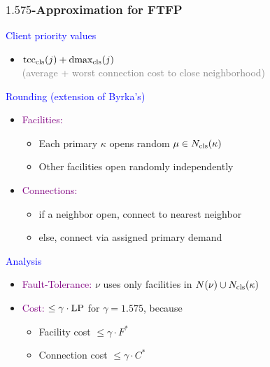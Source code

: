 \documentclass[hyperref,dvipsnames,svgnames,compress]{beamer}
\begin{document}
\begin{frame}
\frametitle{$1.575$-Approximation for FTFP}

{\large

\textcolor{blue}{Client priority values}	
	
	\begin{itemize}
		\item $\mbox{\rm{tcc}}_{{\mbox{\scriptsize\rm cls}}}(j) + \mbox{\rm{dmax}}_{{\mbox{\scriptsize\rm cls}}}(j)$
			\\
			{\normalsize \textcolor{gray}{(average + worst connection cost to close neighborhood)}}
	\end{itemize}

\textcolor{blue}{Rounding (extension of Byrka's)}

  	\begin{itemize}
  	  	\item  \textcolor{purple}{Facilities:} 
			\begin{itemize}
				\item Each primary $\kappa$ opens random $\mu\in N_{{\mbox{\scriptsize\rm cls}}}(\kappa)$
				\item Other facilities open randomly independently
			\end{itemize}
	  	\item \textcolor{purple}{Connections:} 
	 		\begin{itemize}
					\item if a neighbor open, connect to nearest neighbor
					\item else, connect via assigned primary demand
			\end{itemize}
  	\end{itemize}

\textcolor{blue}{Analysis}

  \begin{itemize}
  	\item \textcolor{purple}{Fault-Tolerance:} $\nu$ uses only facilities in
	    $N(\nu) \cup N_{{\mbox{\scriptsize\rm cls}}}(\kappa)$
	
  	\item \textcolor{purple}{Cost:} $\le \gamma\cdot\mbox{\rm LP}$ for $\gamma = 1.575$, because
    \begin{itemize}
    \item Facility cost $ \leq \gamma\cdot F^\ast$
    \item Connection cost $ \leq \gamma\cdot C^\ast$
    \end{itemize}
\end{itemize}
}

\end{frame}
\end{document}
